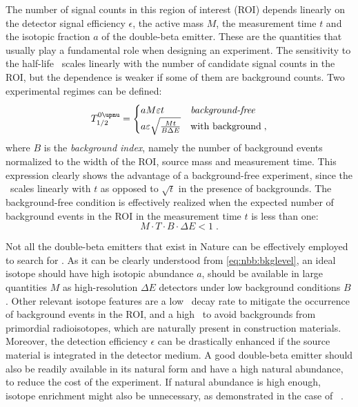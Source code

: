 The number of signal counts in this region of interest (ROI) depends linearly on the
detector signal efficiency $\epsilon$, the active mass $M$, the measurement time $t$ and
the isotopic fraction $a$ of the double-beta emitter.  These are the quantities that
usually play a fundamental role when designing an experiment. The sensitivity to the
half-life \thalfzero\ scales linearly with the number of candidate signal counts in the
ROI, but the dependence is weaker if some of them are background counts. Two experimental
regimes can be defined:
\begin{equation}\label{eq:nbb:bkglevel}
  T^{0\upnu}_{1/2} =
    \begin{cases}
      a M \epsilon t & \text{\emph{background-free}} \\
      a \epsilon \sqrt{\frac{M t}{B \Delta{E}}} & \text{with background} \;, \\
    \end{cases}
\end{equation}
where $B$ is the \emph{background index}, namely the number of background events
normalized to the width of the ROI, source mass and measurement time. This expression
clearly shows the advantage of a background-free experiment, since the \thalfzero\ scales
linearly with $t$ as opposed to $\sqrt{t}$ in the presence of backgrounds. The
background-free condition is effectively realized when the expected number of background
events in the ROI in the measurement time $t$ is less than one:
\[
  M \cdot T \cdot B \cdot \Delta{E} < 1 \;.
\]

Not all the double-beta emitters that exist in Nature can be effectively employed to
search for \onbb. As it can be clearly understood from \cref{eq:nbb:bkglevel}, an ideal
isotope should have high isotopic abundance $a$, should be available in large quantities
$M$ as high-resolution $\Delta{E}$ detectors under low background conditions $B$. Other
relevant isotope features are a low \nnbb\ decay rate to mitigate the occurrence of
background events in the ROI, and a high \qbb\ to avoid backgrounds from primordial
radioisotopes, which are naturally present in construction materials. Moreover, the
detection efficiency $\epsilon$ can be drastically enhanced if the source material is
integrated in the detector medium.  A good double-beta emitter should also be readily
available in its natural form and have a high natural abundance, to reduce the cost of the
experiment. If natural abundance is high enough, isotope enrichment might also be
unnecessary, as demonstrated in the case of ~\cite{Alduino2017}.

